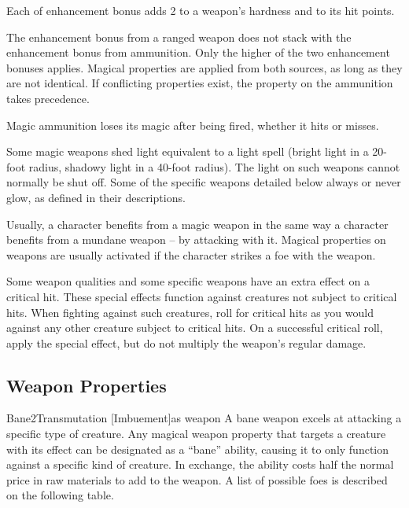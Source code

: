          Each  of enhancement bonus adds 2 to a weapon's hardness and  to its hit points.

         The enhancement bonus from a ranged weapon does not stack with the enhancement bonus from ammunition.
        Only the higher of the two enhancement bonuses applies.
        Magical properties are applied from both sources, as long as they are not identical.
        If conflicting properties exist, the property on the ammunition takes precedence.

        Magic ammunition loses its magic after being fired, whether it hits or misses.

         Some magic weapons shed light equivalent to a light spell (bright light in a 20-foot radius, shadowy light in a 40-foot radius).
        The light on such weapons cannot normally be shut off.
        Some of the specific weapons detailed below always or never glow, as defined in their descriptions.

         Usually, a character benefits from a magic weapon in the same way a character benefits from a mundane weapon -- by attacking with it.
        Magical properties on weapons are usually activated if the character strikes a foe with the weapon.

         Some weapon qualities and some specific weapons have an extra effect on a critical hit.
        These special effects function against creatures not subject to critical hits.
        When fighting against such creatures, roll for critical hits as you would against any other creature subject to critical hits.
        On a successful critical roll, apply the special effect, but do not multiply the weapon's regular damage.

    \subsection{Weapon Properties}\label{Weapon Properties}

        \begin{magicitemdef}{Bane}{2}{Transmutation [Imbuement]}{as weapon}
            \spellspecial A bane weapon excels at attacking a specific type of creature.
            Any magical weapon property that targets a creature with its effect can be designated as a ``bane'' ability, causing it to only function against a specific kind of creature.
            In exchange, the ability costs half the normal price in raw materials to add to the weapon.
            A list of possible foes is described on the following table.
        \end{magicitemdef}

